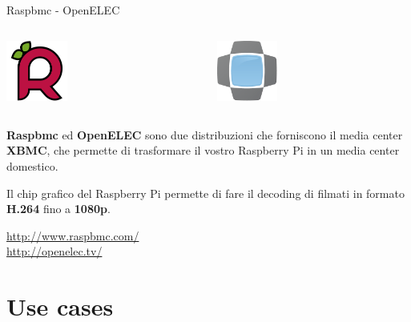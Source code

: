 \documentclass[xcolor=svgnames,11pt]{beamer}
\begin{document}
\begin{frame}[fragile]{Raspbmc - OpenELEC}

\begin{columns}
    \begin{column}{0.5\textwidth}
    \begin{center}
    
    \includegraphics[height=2cm]{raspbmc_logo.png}

    \end{center}	
	\end{column}

    \begin{column}{0.5\textwidth}
    \begin{center}
    
    \includegraphics[height=2cm]{open_elec.png}

    \end{center}	
	\end{column}
\end{columns}

\bigskip
\pause

\textbf{Raspbmc} ed \textbf{OpenELEC} sono due distribuzioni che 	forniscono il media center \textbf{XBMC}, che permette di trasformare il vostro Raspberry Pi in un media center domestico.

\pause
\medskip

Il chip grafico del Raspberry Pi permette di fare il decoding di filmati in formato \textbf{H.264} fino a \textbf{1080p}.

\pause
\begin{center}
\url{http://www.raspbmc.com/} \\
\url{http://openelec.tv/}
\end{center}

\end{frame}

\section{Use cases}
\end{document}
